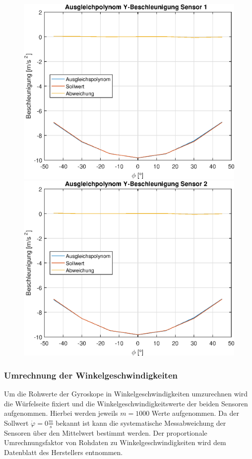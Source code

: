 \vspace*{-\baselineskip}
\begin{figure}[h!]
	\includegraphics[width=0.5\linewidth]{img/Y1__dd___fitted.eps}
	\includegraphics[width=0.5\linewidth]{img/Y2__dd___fitted.eps}
\end{figure}

\subsubsection{Umrechnung der Winkelgeschwindigkeiten}
Um die Rohwerte der Gyroskope in Winkelgeschwindigkeiten umzurechnen wird die Würfelseite fixiert und die Winkelgeschwindigkeitswerte der beiden Sensoren aufgenommen. Hierbei werden jeweils $m = 1000$ Werte aufgenommen. Da der Sollwert $\dot{\varphi} = 0 \frac{m}{s}$ bekannt ist kann die systematische Messabweichung der Sensoren über den Mittelwert bestimmt werden. Der proportionale Umrechnungsfaktor von Rohdaten zu Winkelgeschwindigkeiten wird dem Datenblatt des Herstellers entnommen.

